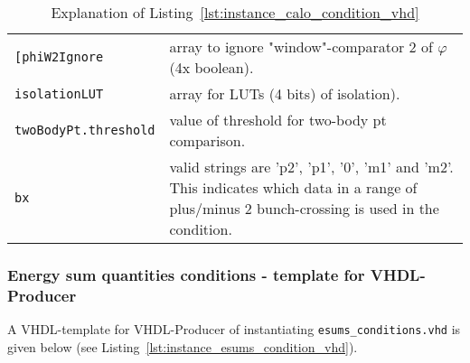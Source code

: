 \begin{table}[htdp]
\begin{center}
\begin{tabular}{l p{}}
\verb|[phiW2Ignore| & array to ignore "window"-comparator 2 of $\varphi$ (4x boolean).\\
\verb|isolationLUT| & array for LUTs (4 bits) of isolation).\\
\verb|twoBodyPt.threshold| & value of threshold for two-body pt comparison.\\
\verb|bx| & valid strings are 'p2', 'p1', '0', 'm1' and 'm2'. This indicates which data in a range of plus/minus 2 bunch-crossing is used in the condition.\\
\bottomrule
\end{tabular}
\end{center}
\caption{Explanation of Listing~\ref{lst:instance_calo_condition_vhd}}
\label{tab:gtl:explanation_instance_calo_condition_vhd}
\end{table}

\clearpage

\subsubsection{Energy sum quantities conditions - template for VHDL-Producer}
\label{sec:gtl:esums_conditions_tme}
A VHDL-template for VHDL-Producer of instantiating \texttt{esums\_conditions.vhd} is given below (see Listing~\ref{lst:instance_esums_condition_vhd}).\\



